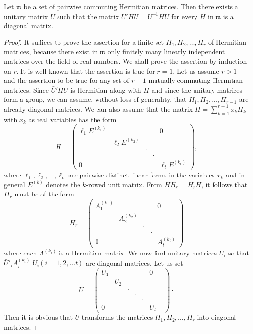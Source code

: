\begin{lem}\label{chap5:lem13}
Let $\mathfrak{m}$ be a set of pairwise commuting Hermitian
matrices. Then there exists a unitary matrix $U$ such that the matrix
$\bar{U}'HU=U^{-1}HU$ for every \pageoriginale $H$ in $\mathfrak{m}$ is
a diagonal matrix.
\end{lem}

\begin{proof}
It suffices to prove the assertion for a finite set $H_1,H_2,\ldots,
H_r$ of Hermitian matrices, because there exist in $\mathfrak{m}$ only
finitely many linearly independent matrices over the field of real
numbers. We shall prove the assertion by induction on $r$. It is
well-known that the assertion is true for $r=1$. Let us assume $r>1$
and the assertion to be true for any set of $r-1$ mutually commuting
Hermitian matrices. Since $\bar{U}' H U$ is Hermitian along with $H$
and since the unitary matrices form a group, we can assume, without
loss of generality, that $H_1,H_2,\ldots, H_{r-1}$ are already
diagonal matrices. We can also assume that the matrix
$H=\sum\limits^{r-1}_{k=1} x_k H_k$ with $x_k$ as real variables has
the form  
$$
H=\begin{pmatrix}
\ell_1 E^{(k_1)} & &&& 0\\
& \ell_2 E^{(k_2)} &&& \\
& & \cdot & & \\
& & & \cdot &\\
0 & & & & \ell_t E^{(k_t)}
\end{pmatrix},
$$
where $\ell_1,\ell_2,\ldots, \ell_t$ are pairwise distinct linear
forms in the variables $x_k$ and in general $E^{(k)}$ denotes the
$k$-rowed unit matrix. From $HH_r=H_rH$, it follows that $H_r$ must be
of the form 
$$
H_r = 
\begin{pmatrix}
A^{(k_1)}_1& &&& 0\\
& A^{(k_2)}_2 && &\\
& & \cdot  &&\\
&&&\cdot &\\
0 & & & & A^{(k_t)}_t
\end{pmatrix}
$$
where each $A^{(k_i)}$ is a Hermitian matrix. We now find unitary
matrices $U_i$ so that \pageoriginale $\bar{U}'_i   A^{(k_i)}_i
\; U_i(i=1,2,\ldots t)$ are diagonal matrices. Let us set 
$$
U= 
\begin{pmatrix}
U_1 & & & & &0\\
& U_2 & & & & &\\
& & \cdot & & &&\\
& & & \cdot & && \\
& & & & \cdot & &\\
0 & & & && U_t 
\end{pmatrix}\cdot
$$
Then it is obvious that $U$ transforms the matrices $H_1,H_2,\ldots,
H_r$ into diagonal matrices.
\end{proof}

